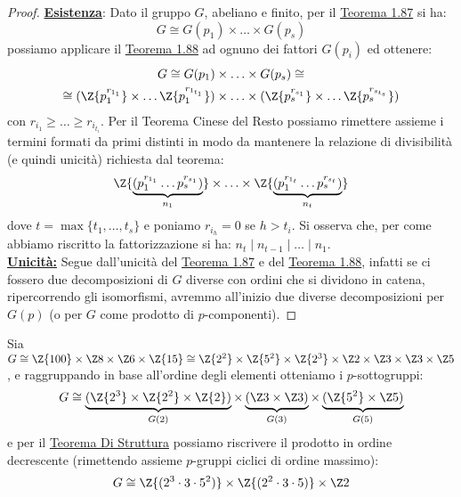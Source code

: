 \documentclass[11pt]{scrartcl}
\begin{document}
\begin{proof}
    \underline{\textbf{Esistenza}}: Dato il gruppo $G$, abeliano e finito, per il \hyperref[t:t1]{Teorema 1.87} si ha:
        \[ G \cong G(p_1) \times \ldots \times G(p_s)
            \]
    possiamo applicare il \hyperref[t:t2]{Teorema 1.88} ad ognuno dei fattori $G(p_i)$ ed ottenere:
        \begin{multline*}
            G \cong G(p_1) \times \ldots \times G(p_s) \cong \\
            \cong (\Z{p_1^{r_{1_1}}} \times \ldots \Z{p_1^{r_{1_{t_1}}}}) \times \ldots \times (\Z{p_s^{r_{s_1}}} \times \ldots \Z{p_s^{r_{s_{t_s}}}})
        \end{multline*}
    con $r_{i_1} \geq \ldots \geq r_{i_{t_i}}$. Per il Teorema Cinese del Resto possiamo rimettere assieme i termini formati da primi distinti in modo da mantenere la relazione di divisibilità (e quindi unicità)
    richiesta dal teorema:
    \[ \Z{\underbrace{(p_1^{r_{1_1}}\ldots p_s^{r_{s_1}})}_{n_1}} \times \ldots \times \Z{\underbrace{(p_1^{r_{1_t}}\ldots p_s^{r_{s_t}})}_{n_t}}
        \]
    dove $t = \max\{t_1,\ldots,t_s\}$ e poniamo $r_{i_h} = 0$ se $h>t_i$. Si osserva che, per come abbiamo riscritto la fattorizzazione si ha: $n_t \mid n_{t-1} \mid \ldots \mid n_1$.\\
    \underline{\textbf{Unicità:}} Segue dall'unicità del \hyperref[t:t1]{Teorema 1.87} e del \hyperref[t:t2]{Teorema 1.88}, infatti se ci fossero due decomposizioni di 
    $G$ diverse con ordini che si dividono in catena, ripercorrendo gli isomorfismi, avremmo all'inizio due diverse decomposizioni per $G(p)$ (o per $G$ come prodotto di $p$-componenti).
\end{proof}

\begin{example}
    Sia $G \cong \Z{100} \times \Z8 \times \Z6 \times \Z{15} \cong \Z{2^2} \times \Z{5^2} \times \Z{2^3} \times \Z2 \times \Z3 \times \Z3 \times \Z5$, e raggruppando in base all'ordine degli elementi
    otteniamo i $p$-sottogruppi:
        \[ G \cong \underbrace{(\Z{2^3} \times \Z{2^2} \times \Z{2})}_{G(2)} \times \underbrace{(\Z3 \times \Z3)}_{G(3)} \times \underbrace{(\Z{5^2} \times \Z5)}_{G(5)}
            \]
    e per il \hyperref[t:struttura]{Teorema Di Struttura} possiamo riscrivere il prodotto in ordine decrescente (rimettendo assieme $p$-gruppi ciclici di ordine massimo):
        \[ G \cong \Z{(2^3\cdot 3 \cdot 5^2)} \times \Z{(2^2 \cdot 3 \cdot 5)} \times \Z2
            \]
\end{example}
\end{document}
